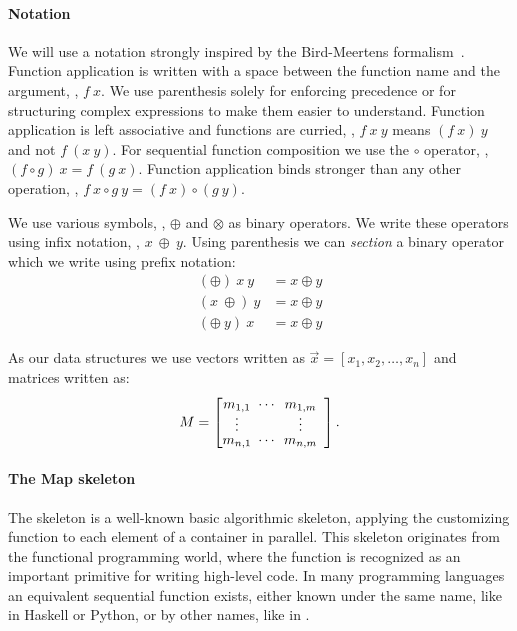 \paragraph{Notation}
\label{par:notation}
We will use a notation strongly inspired by the Bird-Meertens formalism~\cite{Bird88}.
Function application is written with a space between the function name and the argument, \ie, $f\ x$.
We use parenthesis solely for enforcing precedence or for structuring complex expressions to make them easier to understand.
Function application is left associative and functions are curried, \ie, $f\ x\ y$ means $(f\ x)\ y$ and not $f\ (x\ y)$.
For sequential function composition we use the $\circ$ operator, \ie, $(f\circ g)\ x = f\ (g\ x)$.
Function application binds stronger than any other operation, \eg, $f\ x \circ g\ y = (f\ x) \circ (g\ y)$.

We use various symbols, \eg, $\oplus$ and $\otimes$ as binary operators.
We write these operators using infix notation, \ie, $x\ \oplus\ y$.
Using parenthesis we can \emph{section} a binary operator which we write using prefix notation:
\begin{align*}
  (\oplus)\ x\ y &= x \oplus y\\
  (x\ \oplus)\ y &=  x \oplus y\\
  (\oplus\ y)\ x &=  x \oplus y
\end{align*}

As our data structures we use vectors written as $\vec{x} = [x_1, x_2, \ldots, x_n]$ and matrices written as:
\begin{align*}
M = \DottedMatrix{m_{1,1}}{m_{1,m}}{m_{n,1}}{m_{n,m}}.
\end{align*}

\paragraph{The Map skeleton}
The \map skeleton is a well-known basic algorithmic skeleton, applying the customizing function to each element of a container in parallel.
This skeleton originates from the functional programming world, where the  function is recognized as an important primitive for writing high-level code.
In many programming languages an equivalent sequential function exists, either known under the same name, like in Haskell or Python, or by other names, like  in \Cpp.

